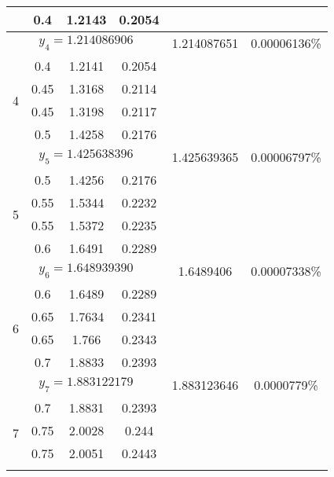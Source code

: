 \begin{longtable}{|c|c|c|c|c|c|}
	                   & 0.4   & 1.2143 & 0.2054         &                &          \\ \hline
	\multicolumn{4}{|c|}{$y_4 = 1.214086906$}            & 1.214087651    & 0.00006136\% \\ \hline
	\multirow{4}{*}{4} & 0.4   & 1.2141 & 0.2054         &                &          \\ \cline{2-4}
	                   & 0.45  & 1.3168 & 0.2114         &                &          \\ \cline{2-4}
	                   & 0.45  & 1.3198 & 0.2117         &                &          \\ \cline{2-4}
	                   & 0.5   & 1.4258 & 0.2176         &                &          \\ \hline
	\multicolumn{4}{|c|}{$y_5 = 1.425638396$}            & 1.425639365    & 0.00006797\% \\ \hline
	\multirow{4}{*}{5} & 0.5   & 1.4256 & 0.2176         &                &          \\ \cline{2-4}
	                   & 0.55  & 1.5344 & 0.2232         &                &          \\ \cline{2-4}
	                   & 0.55  & 1.5372 & 0.2235         &                &          \\ \cline{2-4}
	                   & 0.6   & 1.6491 & 0.2289         &                &          \\ \hline
	\multicolumn{4}{|c|}{$y_6 = 1.648939390$}            & 1.6489406      & 0.00007338\% \\ \hline
	\multirow{4}{*}{6} & 0.6   & 1.6489 & 0.2289         &                &          \\ \cline{2-4}
	                   & 0.65  & 1.7634 & 0.2341         &                &          \\ \cline{2-4}
	                   & 0.65  & 1.766  & 0.2343         &                &          \\ \cline{2-4}
	                   & 0.7   & 1.8833 & 0.2393         &                &          \\ \hline
	\multicolumn{4}{|c|}{$y_7 = 1.883122179$}            & 1.883123646    & 0.0000779\% \\ \hline
	\multirow{4}{*}{7} & 0.7   & 1.8831 & 0.2393         &                &          \\ \cline{2-4}
	                   & 0.75  & 2.0028 & 0.244          &                &          \\ \cline{2-4}
	                   & 0.75  & 2.0051 & 0.2443         &                &          \\ \cline{2-4}

\end{longtable}
